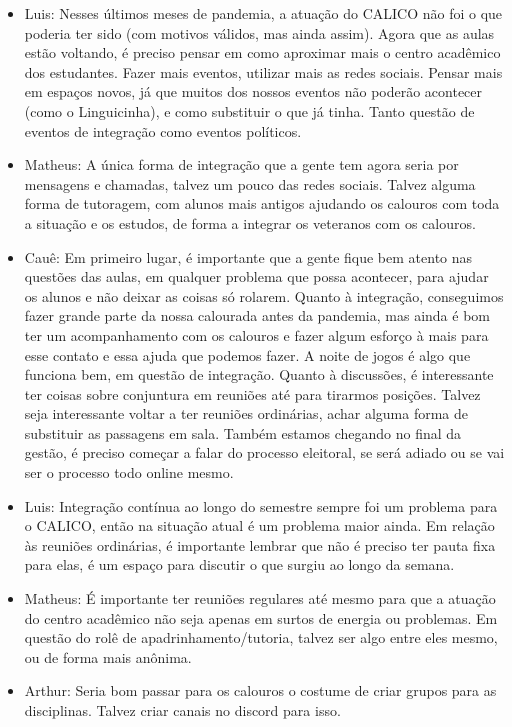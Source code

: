 \documentclass{ata-calico}
\begin{document}
\begin{itemize}
\item Luis: Nesses últimos meses de pandemia, a atuação do CALICO não foi o que poderia ter sido (com motivos válidos, mas ainda assim). Agora que as aulas estão voltando, é preciso pensar em como aproximar mais o centro acadêmico dos estudantes. Fazer mais eventos, utilizar mais as redes sociais. Pensar mais em espaços novos, já que muitos dos nossos eventos não poderão acontecer (como o Linguicinha), e como substituir o que já tinha. Tanto questão de eventos de integração como eventos políticos.
\item Matheus: A única forma de integração que a gente tem agora seria por mensagens e chamadas, talvez um pouco das redes sociais. Talvez alguma forma de tutoragem, com alunos mais antigos ajudando os calouros com toda a situação e os estudos, de forma a integrar os veteranos com os calouros.
\item Cauê: Em primeiro lugar, é importante que a gente fique bem atento nas questões das aulas, em qualquer problema que possa acontecer, para ajudar os alunos e não deixar as coisas só rolarem. Quanto à integração, conseguimos fazer grande parte da nossa calourada antes da pandemia, mas ainda é bom ter um acompanhamento com os calouros e fazer algum esforço à mais para esse contato e essa ajuda que podemos fazer. A noite de jogos é algo que funciona bem, em questão de integração. Quanto à discussões, é interessante ter coisas sobre conjuntura em reuniões até para tirarmos posições. Talvez seja interessante voltar a ter reuniões ordinárias, achar alguma forma de substituir as passagens em sala. Também estamos chegando no final da gestão, é preciso começar a falar do processo eleitoral, se será adiado ou se vai ser o processo todo online mesmo.
\item Luis: Integração contínua ao longo do semestre sempre foi um problema para o CALICO, então na situação atual é um problema maior ainda. Em relação às reuniões ordinárias, é importante lembrar que não é preciso ter pauta fixa para elas, é um espaço para discutir o que surgiu ao longo da semana.
\item Matheus: É importante ter reuniões regulares até mesmo para que a atuação do centro acadêmico não seja apenas em surtos de energia ou problemas. Em questão do rolê de apadrinhamento/tutoria, talvez ser algo entre eles mesmo, ou de forma mais anônima.
\item Arthur: Seria bom passar para os calouros o costume de criar grupos para as disciplinas. Talvez criar canais no discord para isso.

\end{itemize}
\end{document}
